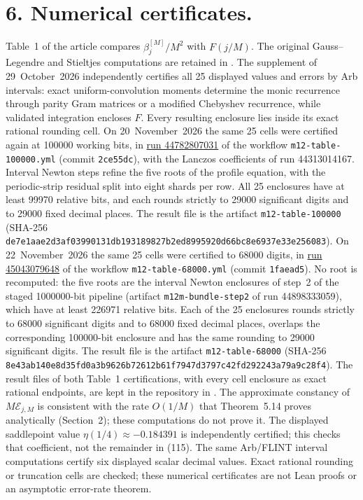 \documentclass[11pt,a4paper]{article}
\newcommand{\R}{https://github.com/ralfanop/Certifications_Eulerian_polar-curve_computations}
\newcommand{\dir}[1]{\href{\R/tree/main/#1}{\texttt{\detokenize{#1}}}}
\newcommand{\eq}[1]{(#1)}
\begin{document}
\section*{6. Numerical certificates.}
Table~1 of the article compares $\beta_j^{[M]}/M^2$ with $F(j/M)$. The original Gauss--Legendre and Stieltjes computations are retained in \dir{numerics/uniform_lanczos}. The supplement of 29~October~2026 independently certifies all 25 displayed values and errors by Arb intervals: exact uniform-convolution moments determine the monic recurrence through parity Gram matrices or a modified Chebyshev recurrence, while validated integration encloses $F$. Every resulting enclosure lies inside its exact rational rounding cell. On 20~November~2026 the same 25 cells were certified again at 100000 working bits, in \href{\R/actions/runs/44782807031}{run 44782807031} of the workflow \texttt{m12-table-100000.yml} (commit \texttt{2ce55dc}), with the Lanczos coefficients of run 44313014167. Interval Newton steps refine the five roots of the profile equation, with the periodic-strip residual split into eight shards per row. All 25 enclosures have at least 99970 relative bits, and each rounds strictly to 29000 significant digits and to 29000 fixed decimal places. The result file is the artifact \texttt{m12-table-100000} (SHA-256 \texttt{de7e1aae2d3af039\allowbreak 90131db193189827\allowbreak b2ed8995920d66bc\allowbreak 8e6937e33e256083}). On 22~November~2026 the same 25 cells were certified to 68000 digits, in \href{\R/actions/runs/45043079648}{run 45043079648} of the workflow \texttt{m12-table-68000.yml} (commit \texttt{1faead5}). No root is recomputed: the five roots are the interval Newton enclosures of step~2 of the staged 1000000-bit pipeline (artifact \texttt{m12m-bundle-step2} of run 44898333059), which have at least 226971 relative bits. Each of the 25 enclosures rounds strictly to 68000 significant digits and to 68000 fixed decimal places, overlaps the corresponding 100000-bit enclosure and has the same rounding to 29000 significant digits. The result file is the artifact \texttt{m12-table-68000} (SHA-256 \texttt{8e43ab140e8d35fd\allowbreak 0a3b9626b72612b6\allowbreak 1f7947d3797c42fd\allowbreak 292243a79a9c28f4}). The result files of both Table~1 certifications, with every cell enclosure as exact rational endpoints, are kept in the repository in \dir{docs/manuscript12/certificates}. The approximate constancy of $M\mathcal E_{j,M}$ is consistent with the rate $O(1/M)$ that Theorem~5.14 proves analytically (Section~2); these computations do not prove it. The displayed saddlepoint value $\eta(1/4)\approx-0.184391$ is independently certified; this checks that coefficient, not the remainder in \eq{115}. The same Arb/FLINT interval computations certify six displayed scalar decimal values. Exact rational rounding or truncation cells are checked; these numerical certificates are not Lean proofs or an asymptotic error-rate theorem.
\end{document}
